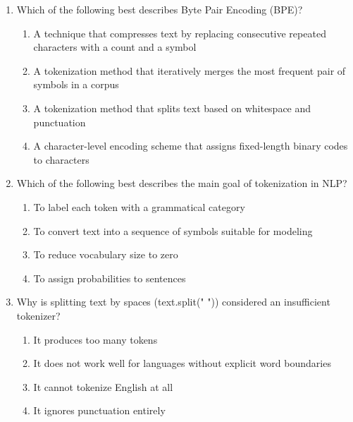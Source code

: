 \documentclass[12pt]{article}
\begin{document}
\begin{enumerate}[label=Q\arabic*.]
\begin{enumerate}[label=(\Alph*)]
    \item A task that identifies predicates in a sentence and labels roles of elements such as agent, theme, or location
    \item A process that assigns grammatical roles like subject and object based on syntactic structure
    \item A method that classifies named entities and links them to a knowledge base
    \item A technique that labels words with their parts of speech and morphological features 
\end{enumerate}
\item Which of the following best describes Byte Pair Encoding (BPE)?
\begin{enumerate}[label=(\Alph*)]
    \item A technique that compresses text by replacing consecutive repeated characters with a count and a symbol
    \item A tokenization method that iteratively merges the most frequent pair of symbols in a corpus
    \item A tokenization method that splits text based on whitespace and punctuation
    \item A character-level encoding scheme that assigns fixed-length binary codes to characters
\end{enumerate}
\item Which of the following best describes the main goal of tokenization in NLP?
\begin{enumerate}[label=(\Alph*)]
    \item To label each token with a grammatical category
    \item To convert text into a sequence of symbols suitable for modeling
    \item To reduce vocabulary size to zero
    \item To assign probabilities to sentences
\end{enumerate}
\item Why is splitting text by spaces (text.split(" ")) considered an insufficient tokenizer?
\begin{enumerate}[label=(\Alph*)]
    \item It produces too many tokens
    \item It does not work well for languages without explicit word boundaries
    \item It cannot tokenize English at all
    \item It ignores punctuation entirely

\end{enumerate}
\end{enumerate}
\end{document}
